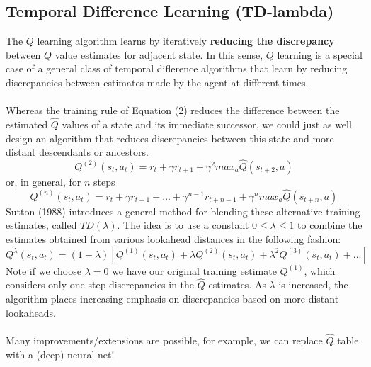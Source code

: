 \subsection{Temporal Difference Learning (TD-lambda)}
The $Q$ learning algorithm learns by iteratively \textbf{reducing the discrepancy} between $Q$ value estimates for adjacent state. In this sense, $Q$ learning is a special case of a general class of temporal diflerence algorithms that learn by reducing discrepancies between estimates made by the agent at different times.\\\\
Whereas the training rule of Equation (2) reduces the difference between the estimated $\hat{Q}$ values of a state and its immediate successor, we could just as well design an algorithm that reduces discrepancies between this state and  more distant descendants or ancestors.
\[Q^{(2)}(s_t, a_t) = r_t + \gamma r_{t+1} + \gamma^2 max_a \hat{Q}(s_{t+2}, a)\]
or, in general, for $n$ steps
\[Q^{(n)}(s_t, a_t) = r_t + \gamma r_{t+1} + ... + \gamma^{n-1}r_{t+n-1} + \gamma^n max_a \hat{Q}(s_{t+n}, a)\]
Sutton (1988) introduces a general method for blending  these alternative training estimates, called $TD(\lambda)$. The idea  is to use a constant $0 \leq \lambda \leq 1$ to combine the estimates obtained from various lookahead distances in the following fashion:
\[Q^\lambda (s_t, a_t) = (1-\lambda)\left[ Q^{(1)}(s_t, a_t) + \lambda Q^{(2)}(s_t, a_t) + \lambda^2 Q^{(3)}(s_t, a_t) + ...\right]\]
Note if we choose $\lambda = 0$ we have our original training estimate $Q^{(1)}$, which considers only one-step discrepancies in the $\hat{Q}$ estimates. As $\lambda$ is increased, the algorithm places increasing emphasis on discrepancies based on more distant lookaheads.\\\\
Many improvements/extensions are possible, for example, we can replace $\hat{Q}$ table with a (deep) neural net!

